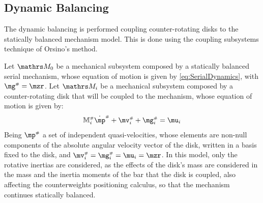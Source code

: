\documentclass[a4paper,11pt,brazil,fleqn]{article}
\begin{document}
\subsection{Dynamic Balancing}\label{S02-3}

The dynamic balancing is performed coupling counter-rotating disks to the statically balanced mechanism model. This is done using the coupling subsystems technique of Orsino's method.

Let $\ssM_0$ be a mechanical subsystem composed by a statically balanced serial mechanism, whose equation of motion is given by \eqref{eq:SerialDynamics}, with $\mg\ssh = \mzr$. Let $\ssM_i$ be a mechanical subsystem composed by a counter-rotating disk that will be coupled to the mechanism, whose equation of motion is given by:
\begin{equation}\label{eq:DiscDynamics}
\mM\ssh_i \dot{\mp}\ssh + \mv\ssh_i + \mg\ssh_i = \mu_i
\end{equation}
Being $\mp\ssh$ a set of independent quasi-velocities, whose elements are non-null components of the absolute angular velocity vector of the disk, written in a basis fixed to the disk, and $\mv\ssh_i = \mg\ssh_i = \mu_i = \mzr$. In this model, only the rotative inertias are considered, as the effects of the disk's mass are considered in the mass and the inertia moments of the bar that the disk is coupled, also affecting the counterweights positioning calculus, so that the mechanism continues statically balanced.
\end{document}
